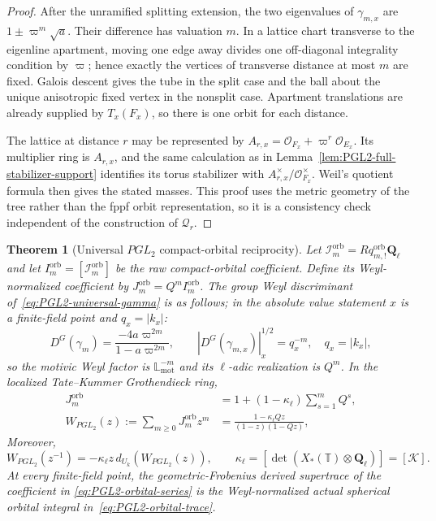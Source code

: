 \documentclass[11pt]{article}
\newtheorem{theorem}{Theorem}[section]
\theoremstyle{definition}
\theoremstyle{remark}
\newcommand{\Qell}{\mathbf Q_\ell}
\newcommand{\Lmot}{\mathbb L_{\mathrm{mot}}}
\newcommand{\Uk}{U_k}
\newcommand{\kappaell}{\kappa_{\ell}}
\newcommand{\cK}{\mathcal K}
\begin{document}
\begin{proof}
After the unramified splitting extension, the two eigenvalues of
$\gamma_{m,x}$ are $1\pm\varpi^m\sqrt a$.  Their difference has valuation
$m$.  In a lattice chart transverse to the eigenline apartment, moving one
edge away divides one off-diagonal integrality condition by $\varpi$; hence
exactly the vertices of transverse distance at most $m$ are fixed.  Galois
descent gives the tube in the split case and the ball about the unique
anisotropic fixed vertex in the nonsplit case.  Apartment translations are
already supplied by $T_x(F_x)$, so there is one orbit for each distance.

The lattice at distance $r$ may be represented by
$A_{r,x}=\mathcal O_{F_x}+\varpi^r\mathcal O_{E_x}$.  Its multiplier ring is
$A_{r,x}$, and the same calculation as in
Lemma~\ref{lem:PGL2-full-stabilizer-support} identifies its torus stabilizer
with $A_{r,x}^{\times}/\mathcal O_{F_x}^{\times}$.  Weil's quotient formula
then gives the stated masses.  This proof uses the metric geometry of the
tree rather than the fppf orbit representation, so it is a consistency check
independent of the construction of $\mathscr Q_r$.
\end{proof}

\begin{theorem}[Universal $PGL_2$ compact-orbital reciprocity]
\label{thm:PGL2-orbital-reciprocity}
Let
$\mathcal I_m^{\mathrm{orb}}=Rq^{\mathrm{orb}}_{m,!}\Qell$ and let
$I_m^{\mathrm{orb}}=[\mathcal I_m^{\mathrm{orb}}]$ be the raw compact-orbital
coefficient.  Define its Weyl-normalized coefficient by
$J_m^{\mathrm{orb}}=Q^mI_m^{\mathrm{orb}}$.  The group Weyl
discriminant of~\eqref{eq:PGL2-universal-gamma} is as follows; in the absolute
value statement $x$ is a finite-field point and $q_x=|k_x|$:
\begin{equation}
 D^G(\gamma_m)
 =\frac{-4a\varpi^{2m}}{1-a\varpi^{2m}},
 \qquad |D^G(\gamma_{m,x})|_x^{1/2}=q_x^{-m},
 \quad q_x=|k_x|,
 \label{eq:PGL2-Weyl-discriminant}
\end{equation}
so the motivic Weyl factor is $\Lmot^{-m}$ and its $\ell$-adic realization is
$Q^m$.  In the localized
Tate--Kummer Grothendieck ring,
\begin{align}
 J_m^{\mathrm{orb}}
 &=1+(1-\kappaell)\sum_{s=1}^mQ^s,
 \label{eq:PGL2-normalized-coefficient}\\
 W_{PGL_2}(z)
 :=\sum_{m\ge0}J_m^{\mathrm{orb}}z^m
 &=\frac{1-\kappaell Qz}{(1-z)(1-Qz)},
 \label{eq:PGL2-orbital-series}
\end{align}
Moreover,
\begin{equation}
 \boxed{W_{PGL_2}(z^{-1})
 =-\kappaell z\,d_{\Uk}(W_{PGL_2}(z)),\qquad
 \kappaell=[\det(X_*(\mathbb T)\otimes\Qell)]=[\cK].}
 \label{eq:PGL2-actual-orbital-reciprocity}
\end{equation}
At every finite-field point, the geometric-Frobenius derived supertrace of the coefficient in
\eqref{eq:PGL2-orbital-series} is the Weyl-normalized actual spherical orbital
integral in~\eqref{eq:PGL2-orbital-trace}.
\end{theorem}
\end{document}
